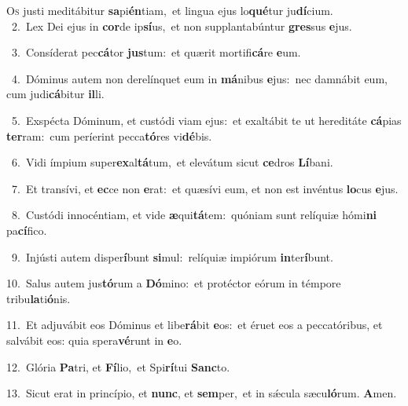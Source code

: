 \lettrine{\initial\textcolor{\initialcolor}{O}}{s} justi meditábitur \textbf{sa}\-pi\-\textbf{én}\-tiam,~\star et lingua ejus lo\-\textbf{qué}\-tur ju\-\textbf{dí}\-cium.\\
{\numbfont\textcolor{\numbcolor}{~2.}}~Lex Dei ejus in \textbf{cor}\-de ip\-\textbf{sí}\-us,~\star et non supplantabúntur \textbf{gres}\-sus \textbf{e}\-jus.\par
{\numbfont\textcolor{\numbcolor}{~3.}}~Consíderat pec\-\textbf{cá}\-tor \textbf{jus}\-tum:~\star et quærit mortifi\-\textbf{cá}\-re \textbf{e}\-um.\par
{\numbfont\textcolor{\numbcolor}{~4.}}~Dóminus autem non derelínquet eum in \textbf{má}\-nibus \textbf{e}\-jus:~\star nec damnábit eum, cum judi\-\textbf{cá}\-bitur \textbf{il}\-li.\par
{\numbfont\textcolor{\numbcolor}{~5.}}~Exspécta Dóminum, et custódi viam ejus:~\dagger et exaltábit te ut hereditáte \textbf{cá}\-pias \textbf{ter}\-ram:~\star cum períerint pecca\-\textbf{tó}\-res vi\-\textbf{dé}\-bis.\par
{\numbfont\textcolor{\numbcolor}{~6.}}~Vidi ímpium super\-\textbf{ex}\-al\-\textbf{tá}\-tum,~\star et elevátum sicut \textbf{ce}\-dros \textbf{Lí}\-bani.\par
{\numbfont\textcolor{\numbcolor}{~7.}}~Et transívi, et \textbf{ec}\-ce non \textbf{e}\-rat:~\star et quæsívi eum, et non est invéntus \textbf{lo}\-cus \textbf{e}\-jus.\par
{\numbfont\textcolor{\numbcolor}{~8.}}~Custódi innocéntiam, et vide \textbf{æ}\-qui\-\textbf{tá}\-tem:~\star quóniam sunt relíquiæ hómi\textbf{ni} pa\-\textbf{cí}\-fico.\par
{\numbfont\textcolor{\numbcolor}{~9.}}~Injústi autem disper\-\textbf{í}\-bunt \textbf{si}\-mul:~\star relíquiæ impiórum \textbf{in}\-ter\-\textbf{í}\-bunt.\par
{\numbfont\textcolor{\numbcolor}{10.}}~Salus autem jus\-\textbf{tó}\-rum a \textbf{Dó}\-mino:~\star et protéctor eórum in témpore tribu\-\textbf{la}\-ti\-\textbf{ó}\-nis.\par
{\numbfont\textcolor{\numbcolor}{11.}}~Et adjuvábit eos Dóminus et libe\-\textbf{rá}\-bit \textbf{e}\-os:~\star et éruet eos a peccatóribus, et salvábit eos: quia spera\-\textbf{vé}\-runt in \textbf{e}\-o.\par
{\numbfont\textcolor{\numbcolor}{12.}}~Glória \textbf{Pa}\-tri, et \textbf{Fí}\-lio,~\star et Spi\-\textbf{rí}\-tui \textbf{Sanc}\-to.\par
{\numbfont\textcolor{\numbcolor}{13.}}~Sicut erat in princípio, et \textbf{nunc}\-, et \textbf{sem}\-per,~\star et in sǽcula sæcu\-\textbf{ló}\-rum. \textbf{A}\-men.\par
